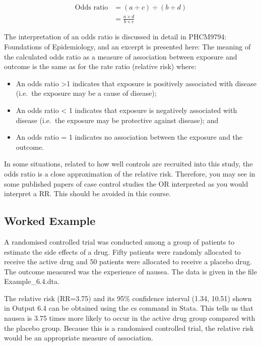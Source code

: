 \documentclass[
]{memoir}
\providecommand{\tightlist}{%
  \setlength{\itemsep}{0pt}\setlength{\parskip}{0pt}}
\begin{document}
\[
\begin{aligned}
\text{Odds ratio} &= (a \div c) \div (b \div d) \\
 &= \frac{a \times d}{b \times c}
\end{aligned}
\]

The interpretation of an odds ratio is discussed in detail in PHCM9794: Foundations of Epidemiology, and an excerpt is presented here: The meaning of the calculated odds ratio as a measure of association between exposure and outcome is the same as for the rate ratio (relative risk) where:

\begin{itemize}
\tightlist
\item
  An odds ratio \textgreater1 indicates that exposure is positively associated with disease (i.e.~the exposure may be a cause of disease);
\item
  An odds ratio \textless{} 1 indicates that exposure is negatively associated with disease (i.e.~the exposure may be protective against disease); and
\item
  An odds ratio = 1 indicates no association between the exposure and the outcome.
\end{itemize}

In some situations, related to how well controls are recruited into this study, the odds ratio is a close approximation of the relative risk. Therefore, you may see in some published papers of case control studies the OR interpreted as you would interpret a RR. This should be avoided in this course.

\hypertarget{worked-example-8}{%
\subsection{Worked Example}\label{worked-example-8}}

A randomised controlled trial was conducted among a group of patients to estimate the side effects of a drug. Fifty patients were randomly allocated to receive the active drug and 50 patients were allocated to receive a placebo drug. The outcome measured was the experience of nausea. The data is given in the file Example\_6.4.dta.

The relative risk (RR=3.75) and its 95\% confidence interval (1.34, 10.51) shown in Output 6.4 can be obtained using the cs command in Stata. This tells us that nausea is 3.75 times more likely to occur in the active drug group compared with the placebo group. Because this is a randomised controlled trial, the relative risk would be an appropriate measure of association.
\end{document}
